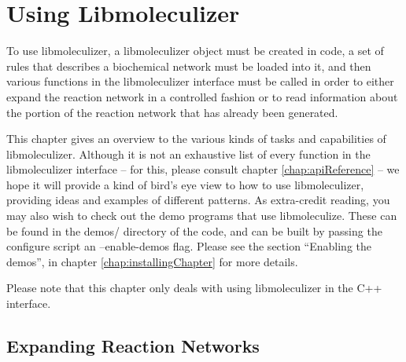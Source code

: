 \chapter{Using Libmoleculizer}
\label{chap:usingLibmoleculizerChapter}

To use libmoleculizer, a libmoleculizer object must be created in
code, a set of rules that describes a biochemical network must be
loaded into it, and then various functions in the libmoleculizer
interface must be called in order to either expand the reaction
network in a controlled fashion or to read information about the
portion of the reaction network that has already been generated.  

This chapter gives an overview to the various kinds of tasks and
capabilities of libmoleculizer.  Although it is not an exhaustive list
of every function in the libmoleculizer interface -- for this, please
consult chapter \ref{chap:apiReference} -- we hope it will provide a
kind of bird's eye view to how to use libmoleculizer, providing ideas
and examples of different patterns.  As extra-credit reading, you may
also wish to check out the demo programs that use libmoleculize.
These can be found in the demos/ directory of the code, and can be
built by passing the configure script an --enable-demos flag.  Please
see the section ``Enabling the demos'', in chapter
\ref{chap:installingChapter} for more details. 

Please note that this chapter only deals with using libmoleculizer in
the C++ interface.  

\section{Expanding Reaction Networks}



